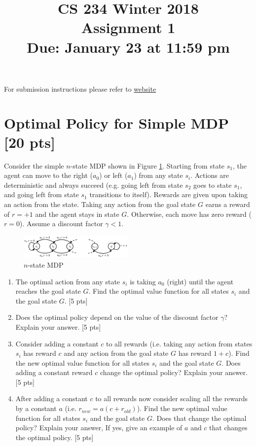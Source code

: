 \documentclass[11pt]{article}
\title{CS 234 Winter 2018 \\ Assignment 1 \\ Due: January 23 at 11:59 pm}
\date{}
\begin{document}
	\maketitle
\noindent For submission instructions please refer to \href{http://web.stanford.edu/class/cs234/assignments.html}{website}

\section{Optimal Policy for Simple MDP [20 pts]}

Consider the simple $n$-state MDP shown in Figure \ref{fig:Q1}. Starting from state $s_1$, the agent can move to the right ($a_0$) or left ($a_1$) from any state $s_i$. Actions are deterministic and always succeed (e.g. going left from
state $s_2$ goes to state $s_1$, and going left from state $s_1$ transitions to itself). Rewards are given upon taking an action from the state. Taking any action from the goal state $G$ earns a reward of $r=+1$
and the agent stays in state $G$. Otherwise, each move has zero reward ($r=0$). Assume a discount factor $\gamma < 1$.

\begin{figure}[h]
  \centering
    \includegraphics[width=0.5\textwidth]{Q1.pdf}
    \caption{$n$-state MDP}
  	\label{fig:Q1}
\end{figure}

\begin{enumerate}[label=(\alph*)]
\item The optimal action from any state $s_i$ is taking $a_0$ (right) until the agent reaches the goal state $G$. Find the optimal value function for all states $s_i$ and the goal state $G$. [5 pts]


\item Does the optimal policy depend on the value of the discount factor $\gamma$? Explain your answer. [5 pts]

\item Consider adding a constant $c$ to all rewards (i.e. taking any action from states $s_i$ has reward $c$ and any action from the goal state $G$ has reward $1+c$). Find the new optimal value function for all states $s_i$ and the goal state $G$. Does adding a constant reward $c$ change the optimal policy? Explain your answer. [5 pts]

\item After adding a constant $c$ to all rewards now consider scaling all the rewards by a constant $a$ (i.e. $r_{new} = a(c+ r_{old})$). Find the new optimal value function for all states $s_i$ and the goal state $G$. Does that change the optimal policy? Explain your answer, If yes, give an example of $a$ and $c$ that changes the optimal policy. [5 pts]

\end{enumerate}
\end{document}
